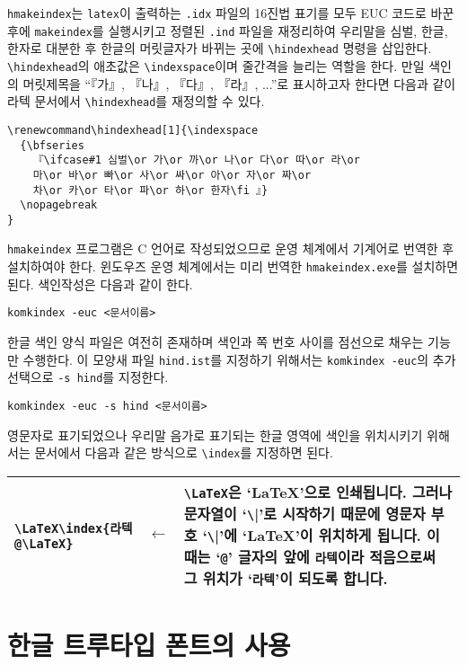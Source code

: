 \texttt{hmakeindex}는 \texttt{latex}이 출력하는 \texttt{.idx} 파일의
16진법 표기를 모두 EUC 코드로 바꾼 후에 \texttt{makeindex}를 실행시키고
정렬된 \texttt{.ind} 파일을 재정리하여 우리말을 심벌, 한글, 한자로
대분한 후 한글의 머릿글자가 바뀌는 곳에
\texttt{\textbackslash{}hindexhead} 명령을
삽입한다.
\texttt{\textbackslash{}hindexhead}의 애초값은
\texttt{\textbackslash{}indexspace}이며 줄간격을 늘리는 역할을 한다.
만일 색인의 머릿제목을 ``『가』, 『나』, 『다』, 『라』, ...''로
표시하고자 한다면 다음과 같이 라텍 문서에서
\texttt{\textbackslash{}hindexhead}를
재정의할 수 있다.
\begin{verbatim}
\renewcommand\hindexhead[1]{\indexspace
  {\bfseries
    『\ifcase#1 심벌\or 가\or 까\or 나\or 다\or 따\or 라\or
    마\or 바\or 빠\or 사\or 싸\or 아\or 자\or 짜\or
    차\or 카\or 타\or 파\or 하\or 한자\fi 』}
  \nopagebreak
}
\end{verbatim}
\texttt{hmakeindex} 프로그램은 C 언어로 작성되었으므로 운영 체계에서
기계어로 번역한 후 설치하여야 한다.  윈도우즈 운영 체계에서는 미리
번역한 \texttt{hmakeindex.exe}를 설치하면 된다.  색인작성은 다음과
같이 한다.
\begin{verbatim}
komkindex -euc <문서이름>
\end{verbatim}

한글 색인 양식 파일은 여전히 존재하며 색인과 쪽 번호 사이를 점선으로
채우는 기능만 수행한다.  이 모양새 파일 \texttt{hind.ist}를 지정하기
위해서는 \texttt{komkindex -euc}의 추가 선택으로 \texttt{-s hind}를
지정한다.
\begin{verbatim}
komkindex -euc -s hind <문서이름>
\end{verbatim}

영문자로 표기되었으나 우리말 음가로 표기되는 한글 영역에 색인을
위치시키기 위해서는 문서에서 다음과 같은 방식으로 \verb|\index|를
지정하면 된다.

\medskip
\begin{tabular}[c]{|lcm{6cm}|}\hline
  \verb|\LaTeX\index{라텍@\LaTeX}| &
  $\leftarrow$ & \verb|\LaTeX|은 `\textrm{\LaTeX}'으로
  인쇄됩니다. 그러나 문자열이 `\verb|\|'로 시작하기 때문에
  영문자 부호 `\verb|\|'에 `\textrm{\LaTeX}'이 위치하게 됩니다. 이
  때는 `\texttt{@}' 글자의 앞에 \texttt{라텍}이라 적음으로써 그 위치가
  `\texttt{라텍}'이 되도록 합니다. \\\hline
\end{tabular}



\chapter{한글 트루타입 폰트의 사용}\label{cha:truetype}

